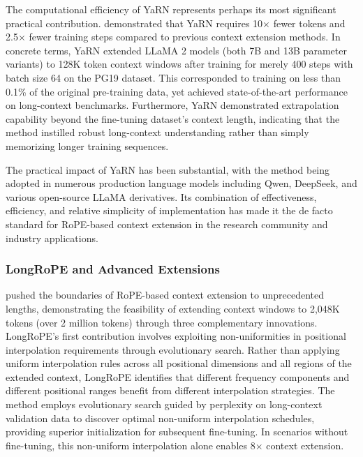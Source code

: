 The computational efficiency of YaRN represents perhaps its most significant practical contribution. \citet{peng2024yarn} demonstrated that YaRN requires 10$\times$ fewer tokens and 2.5$\times$ fewer training steps compared to previous context extension methods. In concrete terms, YaRN extended LLaMA 2 models (both 7B and 13B parameter variants) to 128K token context windows after training for merely 400 steps with batch size 64 on the PG19 dataset. This corresponded to training on less than 0.1\% of the original pre-training data, yet achieved state-of-the-art performance on long-context benchmarks. Furthermore, YaRN demonstrated extrapolation capability beyond the fine-tuning dataset's context length, indicating that the method instilled robust long-context understanding rather than simply memorizing longer training sequences.

The practical impact of YaRN has been substantial, with the method being adopted in numerous production language models including Qwen, DeepSeek, and various open-source LLaMA derivatives. Its combination of effectiveness, efficiency, and relative simplicity of implementation has made it the de facto standard for RoPE-based context extension in the research community and industry applications.

\subsubsection{LongRoPE and Advanced Extensions}

\citet{ding2024longrope} pushed the boundaries of RoPE-based context extension to unprecedented lengths, demonstrating the feasibility of extending context windows to 2,048K tokens (over 2 million tokens) through three complementary innovations. LongRoPE's first contribution involves exploiting non-uniformities in positional interpolation requirements through evolutionary search. Rather than applying uniform interpolation rules across all positional dimensions and all regions of the extended context, LongRoPE identifies that different frequency components and different positional ranges benefit from different interpolation strategies. The method employs evolutionary search guided by perplexity on long-context validation data to discover optimal non-uniform interpolation schedules, providing superior initialization for subsequent fine-tuning. In scenarios without fine-tuning, this non-uniform interpolation alone enables 8$\times$ context extension.

